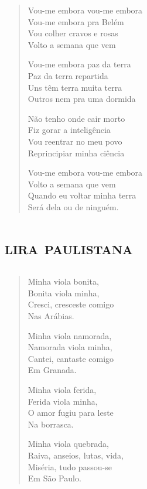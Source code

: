 \begin{verse}
Vou-me embora vou-me embora\\
Vou-me embora pra Belém\\
Vou colher cravos e rosas\\
Volto a semana que vem

Vou-me embora paz da terra\\
Paz da terra repartida\\
Uns têm terra muita terra\\
Outros nem pra uma dormida

Não tenho onde cair morto\\
Fiz gorar a inteligência\\
Vou reentrar no meu povo\\
Reprincipiar minha ciência

Vou-me embora vou-me embora\\
Volto a semana que vem\\
Quando eu voltar minha terra\\
Será dela ou de ninguém.
\end{verse}

\part{\textsc{lira paulistana}}

\chapter*{}

\begin{verse}
Minha viola bonita,\\
Bonita viola minha,\\
Cresci, cresceste comigo\\
\quad\quad{}Nas Arábias.

Minha viola namorada,\\
Namorada viola minha,\\
Cantei, cantaste comigo\\
\quad\quad{}Em Granada.

Minha viola ferida,\\
Ferida viola minha,\\
O amor fugiu para leste\\
Na borrasca.

Minha viola quebrada,\\
Raiva, anseios, lutas, vida,\\
Miséria, tudo passou-se\\
\quad\quad{}Em São Paulo.
\end{verse}



